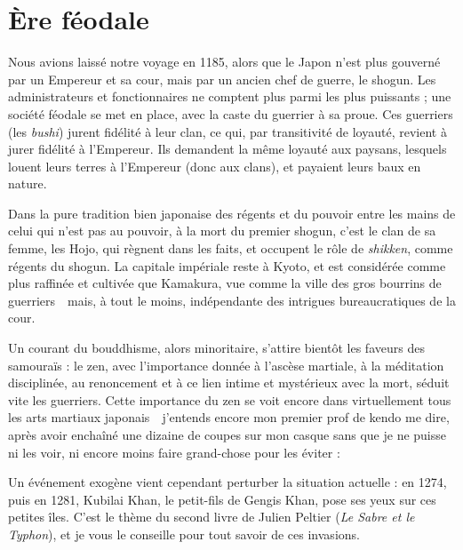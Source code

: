 \chapter{Ère féodale}


Nous avions laissé notre voyage en 1185, alors que le Japon n'est plus gouverné
par un Empereur et sa cour, mais par un ancien chef de guerre, le shogun. Les
administrateurs et fonctionnaires ne comptent plus parmi les plus puissants ;
une société féodale se met en place, avec la caste du guerrier à sa proue. Ces
guerriers (les \emph{bushi}) jurent fidélité à leur clan, ce qui, par
transitivité de loyauté, revient à jurer fidélité à l'Empereur. Ils demandent
la même loyauté aux paysans, lesquels louent leurs terres à l'Empereur (donc
aux clans), et payaient leurs baux en nature.

Dans la pure tradition bien japonaise des régents et du pouvoir entre les mains
de celui qui n'est pas au pouvoir, à la mort du premier shogun, c'est le clan
de sa femme, les Hojo, qui règnent dans les faits, et occupent le rôle de
\emph{shikken}, comme régents du shogun. La capitale impériale reste à Kyoto,
et est considérée comme plus raffinée et cultivée que Kamakura, vue comme la
ville des gros bourrins de guerriers~\incise~mais, à tout le moins,
indépendante des intrigues bureaucratiques de la cour.

Un courant du bouddhisme, alors minoritaire, s'attire bientôt les faveurs des
samouraïs : le zen, avec l'importance donnée à l'ascèse martiale, à la
méditation disciplinée, au renoncement et à ce lien intime et mystérieux avec
la mort, séduit vite les guerriers. Cette importance du zen se voit encore dans
virtuellement tous les arts martiaux japonais~\incise~j'entends encore mon
premier prof de kendo me dire, après avoir enchaîné une dizaine de coupes sur
mon casque sans que je ne puisse ni les voir, ni encore moins faire grand-chose
pour les éviter : 

Un événement exogène vient cependant perturber la situation actuelle : en 1274,
puis en 1281, Kubilai Khan, le petit-fils de Gengis Khan, pose ses yeux sur ces
petites îles. C'est le thème du second livre de Julien Peltier (\emph{Le Sabre
et le Typhon}), et je vous le conseille pour tout savoir de ces invasions.

